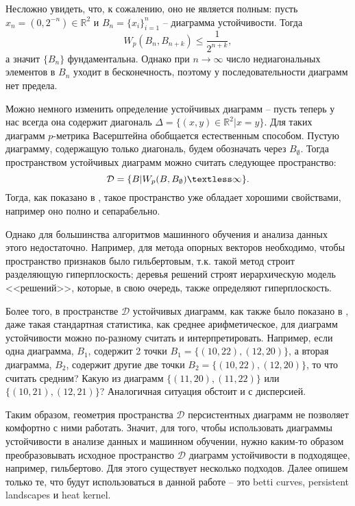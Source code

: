Несложно увидеть, что, к сожалению, оно не является полным: пусть $x_n = (0, 2^{-n}) \in \mathbb{R}^2$ и $B_n = \{x_i\}_{i=1}^n$ -- диаграмма устойчивости. Тогда
\[
	W_p(B_n, B_{n+k}) \leq \frac{1}{2^{n+k}},
\]
а значит $\{B_n\}$ фундаментальна. Однако при $n \to \infty$ число недиагональных элементов в $B_n$ уходит в бесконечность, поэтому у последовательности диаграмм нет предела. 

Можно немного изменить определение устойчивых диаграмм -- пусть теперь у нас всегда она содержит диагональ $\Delta = \{(x,y) \in \mathbb{R}^2 | x=y\}$. Для таких диаграмм $p$-метрика Васерштейна обобщается естественным способом. Пустую диаграмму, содержащую только диагональ, будем обозначать через $B_\emptyset$. Тогда пространством устойчивых диаграмм можно считать следующее пространство:
\[
	\mathcal{D} = \{ B | W_p(B, B_\emptyset) \textless \infty \}.
\]
Тогда, как показано в \cite{prop_measures}, такое пространство уже обладает хорошими свойствами, например оно полно и сепарабельно.

Однако для большинства алгоритмов машинного обучения и анализа данных этого недостаточно. Например, для метода опорных векторов необходимо, чтобы пространство признаков было гильбертовым, т.к. такой метод строит разделяющую гиперплоскость; деревья решений строят иерархическую модель <<решений>>, которые, в свою очередь, также определяют гиперплоскость. 

Более того, в пространстве $\mathcal{D}$ устойчивых диаграмм, как также было показано в \cite{prop_measures}, даже такая стандартная статистика, как среднее арифметическое, для диаграмм устойчивости можно по-разному считать и интерпретировать. Например, если одна диаграмма, $B_1$, содержит 2 точки $B_1 = \{ (10, 22), (12, 20) \}$, а вторая диаграмма, $B_2$, содержит другие две точки $B_2 = \{ (10, 22), (12, 20) \}$, то что считать средним? Какую из диаграмм $ \{ (11, 20), (11, 22) \}$ или $\{ (10,21), (12,21) \}$? Аналогичная ситуация обстоит и с дисперсией. 

Таким образом, геометрия пространства $\mathcal{D}$ персистентных диаграмм не позволяет комфортно с ними работать. Значит, для того, чтобы использовать диаграммы устойчивости в анализе данных и машинном обучении, нужно каким-то образом преобразовывать исходное пространство $\mathcal{D}$ диаграмм устойчивости в подходящее, например, гильбертово. Для этого существует несколько подходов. Далее опишем только те, что будут использоваться в данной работе -- это betti curves, persistent landscapes и heat kernel.

